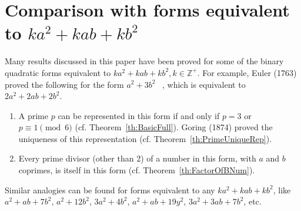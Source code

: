 \documentclass[reqno]{amsart}
\newcommand{\congr}[3]{{\ensuremath{{#1} \equiv {#2}
      \pmod{#3}}}}
\newcommand{\Positive}{\ensuremath{\mathbb{Z^+}}}
\begin{document}
\section{Comparison with forms equivalent to $ka^2+kab+kb^2$}
Many results discussed in this paper have been proved for
some of the binary quadratic forms equivalent to $ka^2+kab+kb^2, k \in
\Positive$.  For example, Euler (1763) proved the following for the form $a^2+3b^2$
~\cite{DIC1923}, which is equivalent to $2a^2+2ab+2b^2$.
\begin{enumerate}
\item A prime $p$ can be represented in this form if and only if
  $p=3$ or \congr{p}{1}{6} (cf. Theorem~\ref{th:BasicFull}).
  Goring (1874) proved the
  uniqueness of this representation (cf. Theorem~\ref{th:PrimeUniqueRep}).
\item Every prime divisor (other than $2$) of a number in
  this form, with $a$ and $b$ coprimes, is itself in this
  form (cf. Theorem~\ref{th:FactorOfBNum}).
\end{enumerate}

Similar analogies can be found for forms equivalent to any
$ka^2+kab+kb^2$, like $a^2+ab+7b^2$, $a^2+12b^2$,
$3a^2+4b^2$, $a^2+ab+19y^2$,
$3a^2+3ab+7b^2$, etc.
\end{document}
